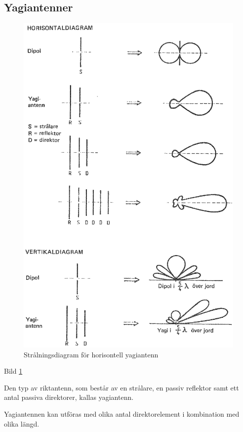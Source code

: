 \subsection{Yagiantenner}

\begin{figure}
  \includegraphics[width=\textwidth]{images/cropped_pdfs/bild_2_6-20.pdf}
  \caption{Strålningsdiagram för horisontell yagiantenn}
  \label{fig:bildII6-20}
\end{figure}

Bild \ref{fig:bildII6-20}

Den typ av riktantenn, som består av en strålare, en passiv reflektor
samt ett antal passiva direktorer, kallas yagiantenn.

Yagiantennen kan utföras med olika antal direktorelement i
kombination med olika längd.

